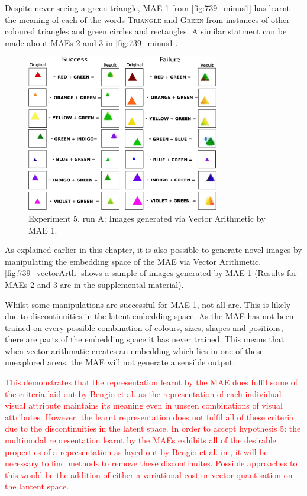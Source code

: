 Despite never seeing a green triangle, \ac{MAE} 1 from \autoref{fig:739_minus1} has learnt the meaning of each of the words \textsc{Triangle} and \textsc{Green} from instances of other coloured triangles and green circles and rectangles. A similar statment can be made about \acp{MAE} 2 and 3 in \autoref{fig:739_minus1}.

\begin{figure}[h]
\centering
\includegraphics[width=0.75\textwidth]{Figs/shapes/739_minus1_vectorArthGT.png}
\caption{Experiment 5, run A: Images generated via Vector Arithmetic by MAE 1.}
\label{fig:739_vectorArth}
\end{figure}

As explained earlier in this chapter, it is also possible to generate novel images by manipulating the embedding space of the \ac{MAE} via Vector Arithmetic. \autoref{fig:739_vectorArth} shows a sample of images generated by \ac{MAE} 1 (Results for \acp{MAE} 2 and 3 are in the supplemental material).

Whilst some manipulations are successful for \ac{MAE} 1, not all are. This is likely due to discontinuities in the latent embedding space. As the \ac{MAE} has not been trained on every possible combination of colours, sizes, shapes and positions, there are parts of the embedding space it has never trained. This means that when vector arithmatic creates an embedding which lies in one of these unexplored areas, the \ac{MAE} will not generate a sensible output. 

\textcolor{red}{This demonstrates that the representation learnt by the \ac{MAE} does fulfil some of the criteria laid out by Bengio et al. \cite{repRev} as the representation of each individual visual attribute maintains its meaning even in unseen combinations of visual attributes. However, the learnt representation does not fulfil all of these criteria due to the discontinuities in the latent space. In order to accept hypothesis 5: the multimodal representation learnt by the \acp{MAE} exhibits all of the desirable properties of a representation as layed out by Bengio et al. in \cite{repRev}, it will be necessary to find methods to remove these discontinuites. Possible approaches to this would be the addition of either a variational cost \cite{kingma2013auto} or vector quantisation \cite{wavenet} on the lantent space.}

